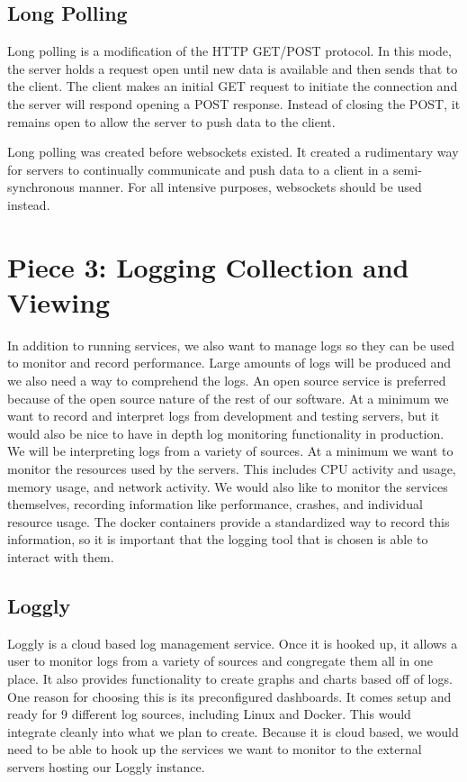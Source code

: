 \documentclass[onecolumn, draftclsnofoot,10pt, compsoc]{IEEEtran}
\begin{document}
\subsection{Long Polling}
Long polling is a modification of the HTTP GET/POST protocol.
In this mode, the server holds a request open until new data is available and then sends that to the client.
The client makes an initial GET request to initiate the connection and the server will respond opening a POST response.
Instead of closing the POST, it remains open to allow the server to push data to the client.

Long polling was created before websockets existed.
It created a rudimentary way for servers to continually communicate and push data to a client in a semi-synchronous manner.
For all intensive purposes, websockets should be used instead.

\section{Piece 3: Logging Collection and Viewing}
In addition to running services, we also want to manage logs so they can be used to monitor and record performance.
Large amounts of logs will be produced and we also need a way to comprehend the logs.
An open source service is preferred because of the open source nature of the rest of our software.
At a minimum we want to record and interpret logs from development and testing servers, but it would also be nice to have in depth log monitoring functionality in production.
We will be interpreting logs from a variety of sources.
At a minimum we want to monitor the resources used by the servers.
This includes CPU activity and usage, memory usage, and network activity.
We would also like to monitor the services themselves, recording information like performance, crashes, and individual resource usage.
The docker containers provide a standardized way to record this information, so it is important that the logging tool that is chosen is able to interact with them.

\subsection{Loggly}
Loggly is a cloud based log management service.
Once it is hooked up, it allows a user to monitor logs from a variety of sources and congregate them all in one place.
It also provides functionality to create graphs and charts based off of logs.
One reason for choosing this is its preconfigured dashboards.
It comes setup and ready for 9 different log sources, including Linux and Docker.
This would integrate cleanly into what we plan to create.
Because it is cloud based, we would need to be able to hook up the services we want to monitor to the external servers hosting our Loggly instance.
\end{document}
